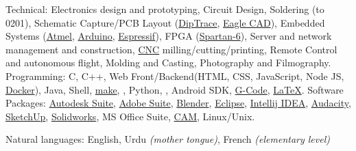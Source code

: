 \documentclass[10pt,letterpaper]{article}
\begin{document}
\inlineheadsection  %
  {Technical:}
  {Electronics design and prototyping,
   Circuit Design,
   Soldering (to 0201),
   Schematic Capture/PCB Layout
    (\href{http://diptrace.com/}{DipTrace},
    \href{http://www.cadsoftusa.com/}{Eagle CAD}),
   Embedded Systems
    (\href{http://www.atmel.com/}{Atmel},
    \href{http://www.arduino.cc/}{Arduino},
    \href{https://espressif.com/}{Espressif}),
   FPGA
    (\href{http://www.xilinx.com/products/silicon-devices/fpga/spartan-6.html}{Spartan-6}),
   Server and network management and construction,
   \href{http://en.wikipedia.org/wiki/Numerical_control}{CNC} milling/cutting/printing,
   Remote Control and autonomous flight,
   Molding and Casting,
   Photography and Filmography.
  }
  \vspace{0.3em}
  \inlineheadsection
  {Programming:}
  {C,
   C++,
   Web Front/Backend(HTML, CSS, JavaScript, Node JS, \href{https://www.docker.com/}{Docker}),
   Java,
   Shell,
   \href{https://www.gnu.org/software/make/}{make},
   ,
   Python,
   ,
   Android SDK,
   \href{http://en.wikipedia.org/wiki/G-code}{G-Code},
   \href{http://www.latex-project.org}{\LaTeX}.
  }
    \vspace{0.3em}
  \inlineheadsection
  {Software Packages:}
  {\href{http://www.autodesk.com/}{Autodesk Suite},
   \href{http://www.adobe.com/}{Adobe Suite},
   \href{http://www.blender.org/}{Blender},
   \href{https://www.eclipse.org/}{Eclipse},
   \href{http://www.jetbrains.com/idea/}{Intellij IDEA},
   \href{http://audacity.sourceforge.net/}{Audacity},
   \href{http://www.sketchup.com/}{SketchUp},
   \href{http://www.solidworks.com/}{Solidworks},
   MS Office Suite,
   \href{http://en.wikipedia.org/wiki/Computer-aided_manufacturing}{CAM},
   Linux/Unix.}

\vspace{0.3em}
\inlineheadsection
  {Natural languages:}
  {English,
   Urdu \emph{(mother tongue)},
   French \emph{(elementary level)}
  }

\end{document}

